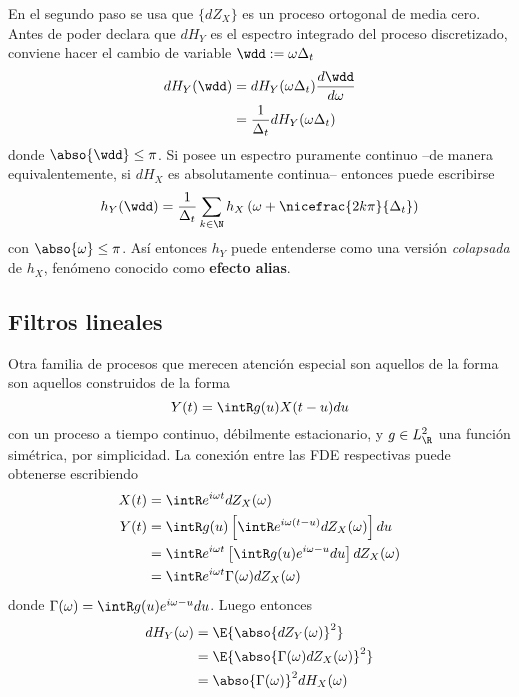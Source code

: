 En el segundo paso se usa que $\{ dZ_X \}$ es un proceso ortogonal de media cero.
Antes de poder declara que $dH_Y$ es el espectro integrado del proceso discretizado,
conviene hacer el cambio de variable $\wdd := \omega \Delta_t$
\begin{align*}
dH_Y(\wdd) &= dH_Y(\omega \Delta_t) \frac{d\wdd}{d\omega} \\
&= \frac{1}{\Delta_t} dH_Y(\omega \Delta_t)
\end{align*}
donde $\abso{\wdd} \leq \pi$.
%
Si \xt posee un espectro puramente continuo --de manera equivalentemente, si $dH_X$ es 
absolutamente continua-- entonces puede escribirse
\begin{equation}
h_Y(\wdd) = \frac{1}{\Delta_t} \sum_{k \in \N} h_X\left( \omega + \nicefrac{2 k \pi}{\Delta_t}\right)
\end{equation}
con $\abso{\omega} \leq \pi$. 
%
Así entonces $h_Y$ puede entenderse como una versión \textit{colapsada} de $h_X$, fenómeno conocido 
como \textbf{efecto alias}.


\subsection{Filtros lineales}

Otra familia de procesos que merecen atención especial son aquellos de la forma son aquellos 
construidos de la forma
\begin{equation}
Y(t) = \intR g(u) X(t-u) du
\end{equation}
%
con \xt un proceso a tiempo continuo, débilmente estacionario, y $g\in L^{2}_{\R}$ una función 
simétrica, por simplicidad. 
%
La conexión entre las FDE respectivas puede obtenerse escribiendo
\begin{align*}
X(t) &= \intR e^{i \omega t }  dZ_X(\omega) \\
Y(t) &= \intR g(u) \left[ \intR e^{i \omega (t-u) }  dZ_X(\omega) \right] du \\
&= \intR e^{i \omega t } \left[ \intR g(u) e^{i \omega -u } du \right] dZ_X(\omega) \\
&= \intR e^{i \omega t } \Gamma(\omega) dZ_X(\omega)
\end{align*}
donde $\Gamma(\omega) = \intR g(u) e^{i \omega -u } du$. 
%
Luego entonces
\begin{align*}
dH_Y(\omega) &= \E{\abso{dZ_Y(\omega)}^{2}}  \\
&= \E{\abso{\Gamma(\omega) dZ_X(\omega)}^{2}}  \\
&= \abso{\Gamma(\omega)}^{2} dH_X(\omega)
\end{align*}

